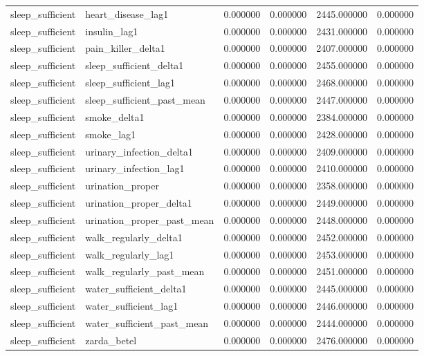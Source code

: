 \begin{longtable}{llrrrr}
sleep\_sufficient & heart\_disease\_lag1 & 0.000000 & 0.000000 & 2445.000000 & 0.000000 \\
sleep\_sufficient & insulin\_lag1 & 0.000000 & 0.000000 & 2431.000000 & 0.000000 \\
sleep\_sufficient & pain\_killer\_delta1 & 0.000000 & 0.000000 & 2407.000000 & 0.000000 \\
sleep\_sufficient & sleep\_sufficient\_delta1 & 0.000000 & 0.000000 & 2455.000000 & 0.000000 \\
sleep\_sufficient & sleep\_sufficient\_lag1 & 0.000000 & 0.000000 & 2468.000000 & 0.000000 \\
sleep\_sufficient & sleep\_sufficient\_past\_mean & 0.000000 & 0.000000 & 2447.000000 & 0.000000 \\
sleep\_sufficient & smoke\_delta1 & 0.000000 & 0.000000 & 2384.000000 & 0.000000 \\
sleep\_sufficient & smoke\_lag1 & 0.000000 & 0.000000 & 2428.000000 & 0.000000 \\
sleep\_sufficient & urinary\_infection\_delta1 & 0.000000 & 0.000000 & 2409.000000 & 0.000000 \\
sleep\_sufficient & urinary\_infection\_lag1 & 0.000000 & 0.000000 & 2410.000000 & 0.000000 \\
sleep\_sufficient & urination\_proper & 0.000000 & 0.000000 & 2358.000000 & 0.000000 \\
sleep\_sufficient & urination\_proper\_delta1 & 0.000000 & 0.000000 & 2449.000000 & 0.000000 \\
sleep\_sufficient & urination\_proper\_past\_mean & 0.000000 & 0.000000 & 2448.000000 & 0.000000 \\
sleep\_sufficient & walk\_regularly\_delta1 & 0.000000 & 0.000000 & 2452.000000 & 0.000000 \\
sleep\_sufficient & walk\_regularly\_lag1 & 0.000000 & 0.000000 & 2453.000000 & 0.000000 \\
sleep\_sufficient & walk\_regularly\_past\_mean & 0.000000 & 0.000000 & 2451.000000 & 0.000000 \\
sleep\_sufficient & water\_sufficient\_delta1 & 0.000000 & 0.000000 & 2445.000000 & 0.000000 \\
sleep\_sufficient & water\_sufficient\_lag1 & 0.000000 & 0.000000 & 2446.000000 & 0.000000 \\
sleep\_sufficient & water\_sufficient\_past\_mean & 0.000000 & 0.000000 & 2444.000000 & 0.000000 \\
sleep\_sufficient & zarda\_betel & 0.000000 & 0.000000 & 2476.000000 & 0.000000 \\

\end{longtable}
